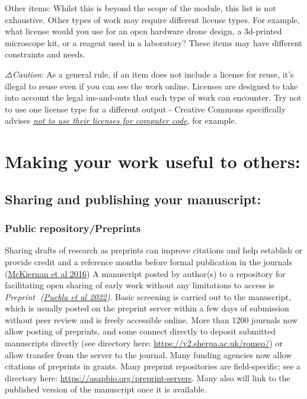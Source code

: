 \documentclass[
  letterpaper,
  DIV=11,
  numbers=noendperiod]{scrreport}
\begin{document}
Other items: Whilst this is beyond the scope of the module, this list is
not exhaustive. Other types of work may require different license types.
For example, what license would you use for an open hardware drone
design, a 3d-printed microscope kit, or a reagent used in a laboratory?
These items may have different constraints and needs.

\emph{⚠️Caution}: As a general rule, if an item does not include a
license for reuse, it's illegal to reuse even if you can see the work
online. Licenses are designed to take into account the legal
ins-and-outs that each type of work can encounter. Try not to use one
license type for a different output - Creative Commons specifically
advises
\emph{\href{https://creativecommons.org/faq/\#can-i-apply-a-creative-commons-license-to-software}{not
to use their licenses for computer code}}, for example.

\hypertarget{making-your-work-useful-to-others}{%
\section{Making your work useful to
others:}\label{making-your-work-useful-to-others}}

\hypertarget{sharing-and-publishing-your-manuscript}{%
\subsection{Sharing and publishing your
manuscript:}\label{sharing-and-publishing-your-manuscript}}

\hypertarget{public-repositorypreprints}{%
\subsubsection{Public
repository/Preprints}\label{public-repositorypreprints}}

Sharing drafts of research as preprints can improve citations and help
establish or provide credit and a reference months before formal
publication in the journals
(\href{https://doi.org/10.7554/eLife.16800}{McKiernan et al 2016}) A
manuscript posted by author(s) to a repository for facilitating open
sharing of early work without any limitations to access is
\emph{📖{Preprint📖 (\href{https://doi.org/10.3998/mpub.12412508}{Puebla
et al 2022})}}. Basic screening is carried out to the manuscript, which
is usually posted on the preprint server within a few days of submission
without peer review and is freely accessible online. More than 1200
journals now allow posting of preprints, and some connect directly to
deposit submitted manuscripts directly (see directory here:
\url{https://v2.sherpa.ac.uk/romeo/}) or allow transfer from the server
to the journal. Many funding agencies now allow citations of preprints
in grants. Many preprint repositories are field-specific; see a
directory here: \url{https://asapbio.org/preprint-servers}. Many also
will link to the published version of the manuscript once it is
available.
\end{document}
